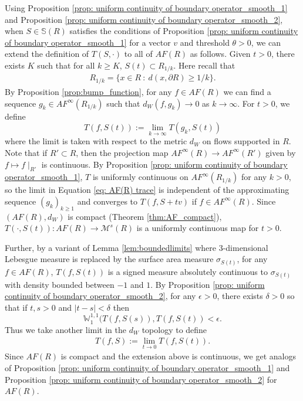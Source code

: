 \documentclass[11pt]{article}
\theoremstyle{remark}
\theoremstyle{definition}
\newcommand{\mc}[1]{\mathcal{#1}}
\newcommand{\m}[1]{\mathbb{#1}}
\begin{document}
Using Proposition \ref{prop: uniform continuity of boundary operator_smooth_1} and Proposition \ref{prop: uniform continuity of boundary operator_smooth_2}, when $S\in \m S(R)$ satisfies the conditions of Proposition \ref{prop: uniform continuity of boundary operator_smooth_1} for a vector $v$ and threshold $\theta>0$, we can extend the definition of $T(S,\cdot)$ to all of $AF(R)$ as follows. Given $t>0$, there exists $K$ such that for all $k\geq K$, $S(t)\subset R_{1/k}$. Here recall that 
\begin{align*}
    R_{1/k} = \{x\in R ~:~ d(x,\partial R) \geq 1/k\}.
\end{align*}
By Proposition \ref{prop:bump_function}, for any $f\in AF(R)$ we can find a sequence $g_k\in AF^\infty(R_{1/k})$ such that $d_W(f, g_k)\to 0$ as $k\to \infty$. For $t>0$, we define
\begin{equation}\label{eq: AF(R) trace}
    T(f,S(t)) := \lim_{k\to \infty} T(g_k,S(t))
\end{equation}
where the limit is taken with respect to the metric $d_W$ on flows supported in $R$. Note that if $R'\subset R$, then the projection map $AF^\infty(R) \to AF^\infty(R')$ given by $f\mapsto f\mid_{R'}$ is continuous. By Proposition \ref{prop: uniform continuity of boundary operator_smooth_1}, $T$ is uniformly continuous on $AF^\infty(R_{1/k})$ for any $k>0$, so the limit in Equation \eqref{eq: AF(R) trace} is independent of the approximating sequence $(g_k)_{k\geq 1}$ and converges to $T(f,S+tv)$ if $f\in AF^\infty(R)$. Since $(AF(R),d_W)$ is compact (Theorem \ref{thm:AF_compact}), $T(\cdot, S(t)):AF(R)\to \mc M^s(R)$ is a uniformly continuous map for $t>0$. 

Further, by a variant of Lemma \ref{lem:boundedlimits} where 3-dimensional Lebesgue measure is replaced by the surface area measure $\sigma_{S(t)}$, for any $f\in AF(R)$, $T(f,S(t))$ is a signed measure absolutely continuous to $\sigma_{S(t)}$ with density bounded between $-1$ and $1$. By Proposition \ref{prop: uniform continuity of boundary operator_smooth_2}, for any $\epsilon>0$, there exists $\delta>0$ so that if $t,s>0$ and $|t-s|<\delta$ then
\begin{equation}\label{eq: prop 5 for AF(R)}
    \m W_1^{1,1}(T(f,S(s)), T(f,S(t))< \epsilon.
\end{equation}
Thus we take another limit in the $d_W$ topology to define 
\begin{align*}
    T(f,S):= \lim_{t\to 0} T(f,S(t)). 
\end{align*}
Since $AF(R)$ is compact and the extension above is continuous, we get analogs of Proposition \ref{prop: uniform continuity of boundary operator_smooth_1} and Proposition \ref{prop: uniform continuity of boundary operator_smooth_2} for $AF(R)$.
\end{document}
